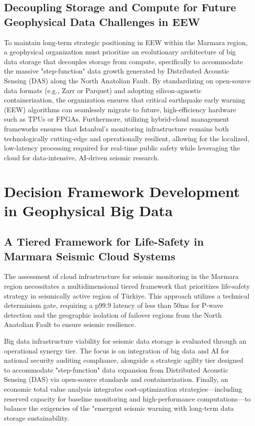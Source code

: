 \documentclass[data,article,submit,pdftex,moreauthors]{Definitions/mdpi}
\begin{document}
\subsection{Decoupling Storage and Compute for Future Geophysical Data Challenges in EEW}

To maintain long-term strategic positioning in EEW within the Marmara region, a geophysical organization must prioritize an evolutionary architecture of big data storage that decouples storage from compute, specifically to accommodate the massive "step-function" data growth generated by Distributed Acoustic Sensing (DAS) along the North Anatolian Fault. By standardizing on open-source data formats (e.g., Zarr or Parquet) and adopting silicon-agnostic containerization, the organization ensures that critical earthquake early warning (EEW) algorithms can seamlessly migrate to future, high-efficiency hardware such as TPUs or FPGAs. Furthermore, utilizing hybrid-cloud management frameworks ensures that Istanbul’s monitoring infrastructure remains both technologically cutting-edge and operationally resilient, allowing for the localized, low-latency processing required for real-time public safety while leveraging the cloud for data-intensive, AI-driven seismic research.

\section{Decision Framework Development in Geophysical Big Data}

\subsection{A Tiered Framework for Life-Safety in Marmara Seismic Cloud Systems}

The assessment of cloud infrastructure for seismic monitoring in the Marmara region necessitates a multidimensional tiered framework that prioritizes life-safety strategy in seismically active region of Türkiye. This approach utilizes a technical determinism gate, requiring a p99.9 latency of less than 50ms for P-wave detection and the geographic isolation of failover regions from the North Anatolian Fault to ensure seismic resilience. 

Big data infrastructure viability for seismic data storage is evaluated through an operational synergy tier. The focus is on integration of big data and AI for national security auditing compliance, alongside a strategic agility tier designed to accommodate "step-function" data expansion from Distributed Acoustic Sensing (DAS) via open-source standards and containerization. Finally, an economic total value analysis integrates cost-optimization strategies—including reserved capacity for baseline monitoring and high-performance computations—to balance the exigencies of the "emergent seismic warning with long-term data storage sustainability.
\end{document}
